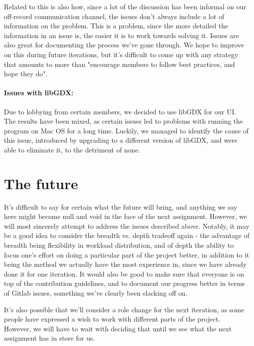\documentclass{article}
\begin{document}
Related to this is also how, since a lot of the discussion has been informal on our off-record communication channel, the issues don't always include a lot of information on the problem. This is a problem, since the more detailed the information in an issue is, the easier it is to work towards solving it. Issues are also great for documenting the process we've gone through. We hope to improve on this during future iterations, but it's difficult to come up with any strategy that amounts to more than "encourage members to follow best practices, and hope they do".

\paragraph{Issues with libGDX:} Due to lobbying from certain members, we decided to use libGDX for our UI. The results have been mixed, as certain issues led to problems with running the program on Mac OS for a long time. Luckily, we managed to identify the cause of this issue, introduced by upgrading to a different version of libGDX, and were able to eliminate it, to the detriment of none.

\section*{The future}

It's difficult to say for certain what the future will bring, and anything we say here might become null and void in the face of the next assignment. However, we will most sincerely attempt to address the issues described above. Notably, it may be a good idea to consider the breadth vs. depth tradeoff again - the advantage of breadth being flexibility in workload distribution, and of depth the ability to focus one's effort on doing a particular part of the project better, in addition to it being the method we actually have the most experience in, since we have already done it for one iteration. It would also be good to make sure that everyone is on top of the contribution guidelines, and to document our progress better in terms of Gitlab issues, something we've clearly been slacking off on.

It's also possible that we'll consider a role change for the next iteration, as some people have expressed a wish to work with different parts of the project. However, we will have to wait with deciding that until we see what the next assignment has in store for us.
\end{document}
